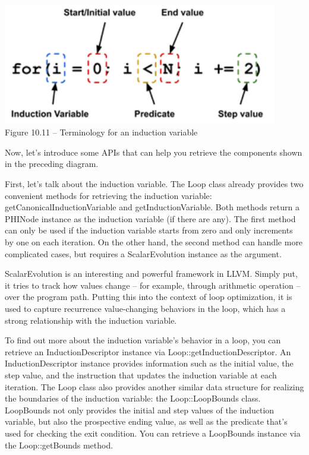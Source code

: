 \hspace*{\fill} \\ %
\begin{center}
\includegraphics[width=0.9\textwidth]{content/3/chapter10/images/11.png}\\
Figure 10.11 – Terminology for an induction variable
\end{center}

Now, let's introduce some APIs that can help you retrieve the components shown in the preceding diagram.

First, let's talk about the induction variable. The Loop class already provides two convenient methods for retrieving the induction variable: getCanonicalInductionVariable and getInductionVariable. Both methods return a PHINode instance as the induction variable (if there are any). The first method can only be used if the induction variable starts from zero and only increments by one on each iteration. On the other hand, the second method can handle more complicated cases, but requires a ScalarEvolution instance as the argument.

ScalarEvolution is an interesting and powerful framework in LLVM. Simply put, it tries to track how values change – for example, through arithmetic operation – over the program path. Putting this into the context of loop optimization, it is used to capture recurrence value-changing behaviors in the loop, which has a strong relationship with the induction variable.

To find out more about the induction variable's behavior in a loop, you can retrieve an InductionDescriptor instance via Loop::getInductionDescriptor. An InductionDescriptor instance provides information such as the initial value, the step value, and the instruction that updates the induction variable at each iteration. The Loop class also provides another similar data structure for realizing the boundaries of the induction variable: the Loop::LoopBounds class. LoopBounds not only provides the initial and step values of the induction variable, but also the prospective ending value, as well as the predicate that's used for checking the exit condition. You can retrieve a LoopBounds instance via the Loop::getBounds method.

